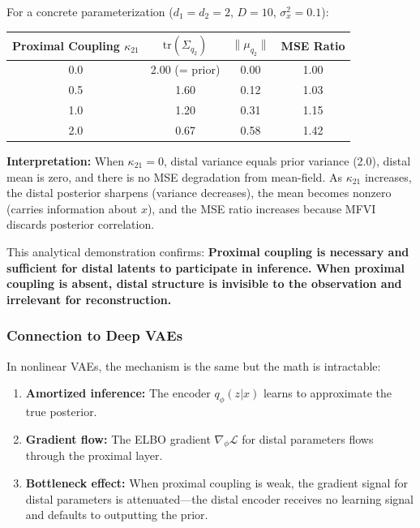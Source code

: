 \documentclass[10pt]{article} %
\theoremstyle{plain}
\theoremstyle{definition}
\begin{document}
For a concrete parameterization ($d_1 = d_2 = 2$, $D = 10$, $\sigma_x^2 = 0.1$):

\begin{center}
\begin{tabular}{cccc}
\toprule
Proximal Coupling $\kappa_{21}$ & $\text{tr}(\Sigma_{q_2})$ & $\|\mu_{q_2}\|$ & MSE Ratio \\
\midrule
0.0 & 2.00 (= prior) & 0.00 & 1.00 \\
0.5 & 1.60 & 0.12 & 1.03 \\
1.0 & 1.20 & 0.31 & 1.15 \\
2.0 & 0.67 & 0.58 & 1.42 \\
\bottomrule
\end{tabular}
\end{center}

\noindent \textbf{Interpretation:} When $\kappa_{21} = 0$, distal variance equals prior variance (2.0), distal mean is zero, and there is no MSE degradation from mean-field. As $\kappa_{21}$ increases, the distal posterior sharpens (variance decreases), the mean becomes nonzero (carries information about $x$), and the MSE ratio increases because MFVI discards posterior correlation.

This analytical demonstration confirms: \textbf{Proximal coupling is necessary and sufficient for distal latents to participate in inference. When proximal coupling is absent, distal structure is invisible to the observation and irrelevant for reconstruction.}

\subsubsection{Connection to Deep VAEs}

In nonlinear VAEs, the mechanism is the same but the math is intractable:
\begin{enumerate}
    \item \textbf{Amortized inference:} The encoder $q_\phi(z|x)$ learns to approximate the true posterior.
    \item \textbf{Gradient flow:} The ELBO gradient $\nabla_\phi \mathcal{L}$ for distal parameters flows through the proximal layer.
    \item \textbf{Bottleneck effect:} When proximal coupling is weak, the gradient signal for distal parameters is attenuated---the distal encoder receives no learning signal and defaults to outputting the prior.
\end{enumerate}
\end{document}
